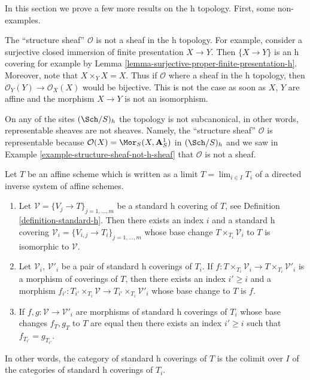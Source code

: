 \noindent
In this section we prove a few more results on the h topology.
First, some non-examples.

\begin{example}
\label{example-structure-sheaf-not-h-sheaf}
The ``structure sheaf'' $\mathcal{O}$ is not a sheaf in the h topology.
For example, consider a surjective closed immersion of finite
presentation $X \to Y$. Then $\{X \to Y\}$ is an h covering
for example by Lemma \ref{lemma-surjective-proper-finite-presentation-h}.
Moreover, note that $X \times_Y X = X$.
Thus if $\mathcal{O}$ where a sheaf in the h topology, then
$\mathcal{O}_Y(Y) \to \mathcal{O}_X(X)$ would be bijective.
This is not the case as soon as $X$, $Y$ are affine and the morphism
$X \to Y$ is not an isomorphism.
\end{example}

\begin{example}
\label{example-representable-sheaf-not-h-sheaf}
On any of the sites $(\Sch/S)_h$ the topology is not subcanonical,
in other words, representable sheaves are not sheaves.
Namely, the ``structure sheaf'' $\mathcal{O}$ is representable
because $\mathcal{O}(X) = \Mor_S(X, \mathbf{A}^1_S)$
in $(\Sch/S)_h$ and we saw in
Example \ref{example-structure-sheaf-not-h-sheaf}
that $\mathcal{O}$ is not a sheaf.
\end{example}

\begin{lemma}
\label{lemma-limit-h-topology}
Let $T$ be an affine scheme which is written as a limit
$T = \lim_{i \in I} T_i$ of a directed inverse system of affine schemes.
\begin{enumerate}
\item Let $\mathcal{V} = \{V_j \to T\}_{j = 1, \ldots, m}$ be a
standard h covering of $T$, see Definition
\ref{definition-standard-h}.
Then there exists an index $i$ and a standard h covering
$\mathcal{V}_i = \{V_{i, j} \to T_i\}_{j = 1, \ldots, m}$
whose base change $T \times_{T_i} \mathcal{V}_i$ to $T$
is isomorphic to $\mathcal{V}$.
\item Let $\mathcal{V}_i$, $\mathcal{V}'_i$ be a pair of standard
h coverings of $T_i$. If
$f : T \times_{T_i} \mathcal{V}_i \to T \times_{T_i} \mathcal{V}'_i$ is
a morphism of coverings of $T$, then there exists an index
$i' \geq i$ and a morphism
$f_{i'} : T_{i'} \times_{T_i} \mathcal{V} \to
T_{i'} \times_{T_i} \mathcal{V}'_i$
whose base change to $T$ is $f$.
\item If
$f, g : \mathcal{V} \to \mathcal{V}'_i$
are morphisms of standard h coverings of $T_i$ whose
base changes $f_T, g_T$ to $T$ are equal then there exists an
index $i' \geq i$ such that $f_{T_{i'}} = g_{T_{i'}}$.
\end{enumerate}
In other words, the category of standard h coverings of $T$ is
the colimit over $I$ of the categories of standard h coverings of $T_i$.
\end{lemma}

